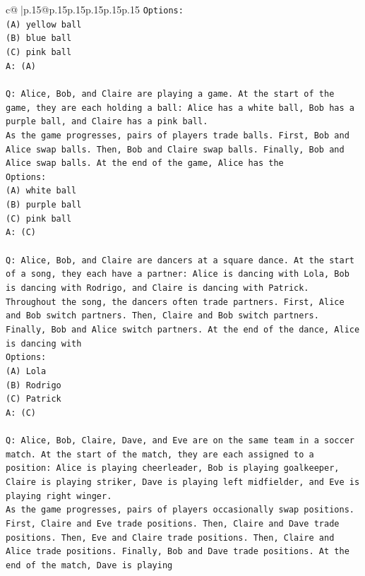 \documentclass{article}
\begin{document}
{\begin{supertabular}{c@{$\;$}|p{.15\linewidth}@{}p{.15\linewidth}p{.15\linewidth}p{.15\linewidth}p{.15\linewidth}p{.15\linewidth}}
{{{\texttt{Options:} \\
\texttt{(A) yellow ball} \\
\texttt{(B) blue ball} \\
\texttt{(C) pink ball} \\
\texttt{A: (A)} \\
\\ 
\texttt{Q: Alice, Bob, and Claire are playing a game. At the start of the game, they are each holding a ball: Alice has a white ball, Bob has a purple ball, and Claire has a pink ball.} \\
\texttt{As the game progresses, pairs of players trade balls. First, Bob and Alice swap balls. Then, Bob and Claire swap balls. Finally, Bob and Alice swap balls. At the end of the game, Alice has the} \\
\texttt{Options:} \\
\texttt{(A) white ball} \\
\texttt{(B) purple ball} \\
\texttt{(C) pink ball} \\
\texttt{A: (C)} \\
\\ 
\texttt{Q: Alice, Bob, and Claire are dancers at a square dance. At the start of a song, they each have a partner: Alice is dancing with Lola, Bob is dancing with Rodrigo, and Claire is dancing with Patrick.} \\
\texttt{Throughout the song, the dancers often trade partners. First, Alice and Bob switch partners. Then, Claire and Bob switch partners. Finally, Bob and Alice switch partners. At the end of the dance, Alice is dancing with} \\
\texttt{Options:} \\
\texttt{(A) Lola} \\
\texttt{(B) Rodrigo} \\
\texttt{(C) Patrick} \\
\texttt{A: (C)} \\
\\ 
\texttt{Q: Alice, Bob, Claire, Dave, and Eve are on the same team in a soccer match. At the start of the match, they are each assigned to a position: Alice is playing cheerleader, Bob is playing goalkeeper, Claire is playing striker, Dave is playing left midfielder, and Eve is playing right winger.} \\
\texttt{As the game progresses, pairs of players occasionally swap positions. First, Claire and Eve trade positions. Then, Claire and Dave trade positions. Then, Eve and Claire trade positions. Then, Claire and Alice trade positions. Finally, Bob and Dave trade positions. At the end of the match, Dave is playing} \\
}}}
\end{supertabular}}
\end{document}
